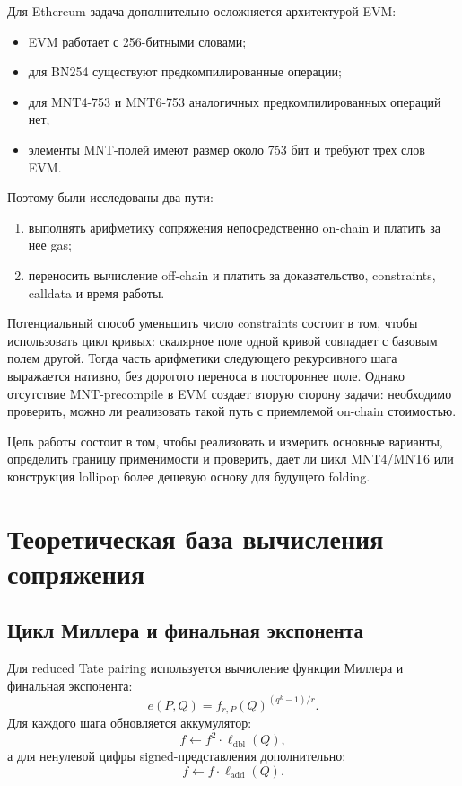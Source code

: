 \documentclass[12pt,a4paper]{article}
\begin{document}
Для Ethereum задача дополнительно осложняется архитектурой EVM:
\begin{itemize}
    \item EVM работает с 256-битными словами;
    \item для BN254 существуют предкомпилированные операции;
    \item для MNT4-753 и MNT6-753 аналогичных предкомпилированных операций нет;
    \item элементы MNT-полей имеют размер около 753 бит и требуют трех слов EVM.
\end{itemize}

Поэтому были исследованы два пути:
\begin{enumerate}
    \item выполнять арифметику сопряжения непосредственно on-chain и платить
    за нее gas;
    \item переносить вычисление off-chain и платить за доказательство,
    constraints, calldata и время работы.
\end{enumerate}

Потенциальный способ уменьшить число constraints состоит в том, чтобы
использовать цикл кривых: скалярное поле одной кривой совпадает с базовым полем
другой. Тогда часть арифметики следующего рекурсивного шага выражается
нативно, без дорогого переноса в постороннее поле. Однако отсутствие
MNT-precompile в EVM создает вторую сторону задачи: необходимо проверить,
можно ли реализовать такой путь с приемлемой on-chain стоимостью.

Цель работы состоит в том, чтобы реализовать и измерить основные варианты,
определить границу применимости и проверить, дает ли цикл MNT4/MNT6 или
конструкция lollipop более дешевую основу для будущего folding.

\section{Теоретическая база вычисления сопряжения}

\subsection{Цикл Миллера и финальная экспонента}

Для reduced Tate pairing используется вычисление функции Миллера и финальная
экспонента:
\[
    e(P,Q)=f_{r,P}(Q)^{(q^k-1)/r}.
\]
Для каждого шага обновляется аккумулятор:
\[
    f \leftarrow f^2\cdot \ell_{\mathrm{dbl}}(Q),
\]
а для ненулевой цифры signed-представления дополнительно:
\[
    f \leftarrow f\cdot \ell_{\mathrm{add}}(Q).
\]
\end{document}
